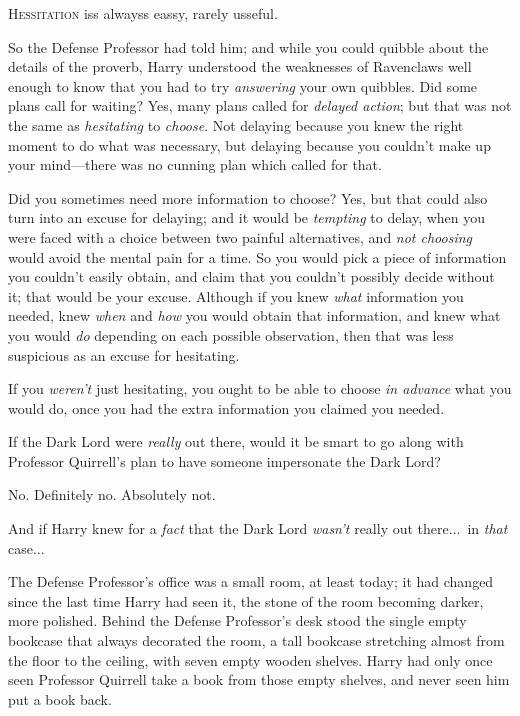 
\begin{em}\lettrine{H}{essitation} iss alwayss eassy, rarely usseful.\par\end{em}

\quad\quad So the Defense Professor had told him; and while you could quibble about the details of the proverb, Harry understood the weaknesses of Ravenclaws well enough to know that you had to try \emph{answering} your own quibbles. Did some plans call for waiting? Yes, many plans called for \emph{delayed action}; but that was not the same as \emph{hesitating} to \emph{choose}. Not delaying because you knew the right moment to do what was necessary, but delaying because you couldn’t make up your mind—there was no cunning plan which called for that.

Did you sometimes need more information to choose? Yes, but that could also turn into an excuse for delaying; and it would be \emph{tempting} to delay, when you were faced with a choice between two painful alternatives, and \emph{not choosing} would avoid the mental pain for a time. So you would pick a piece of information you couldn’t easily obtain, and claim that you couldn’t possibly decide without it; that would be your excuse. Although if you knew \emph{what} information you needed, knew \emph{when} and \emph{how} you would obtain that information, and knew what you would \emph{do} depending on each possible observation, then that was less suspicious as an excuse for hesitating.

If you \emph{weren’t} just hesitating, you ought to be able to choose \emph{in advance} what you would do, once you had the extra information you claimed you needed.

If the Dark Lord were \emph{really} out there, would it be smart to go along with Professor Quirrell’s plan to have someone impersonate the Dark Lord?

No. Definitely no. Absolutely not.

And if Harry knew for a \emph{fact} that the Dark Lord \emph{wasn’t} really out there...\ in \emph{that} case...

The Defense Professor’s office was a small room, at least today; it had changed since the last time Harry had seen it, the stone of the room becoming darker, more polished. Behind the Defense Professor’s desk stood the single empty bookcase that always decorated the room, a tall bookcase stretching almost from the floor to the ceiling, with seven empty wooden shelves. Harry had only once seen Professor Quirrell take a book from those empty shelves, and never seen him put a book back.

